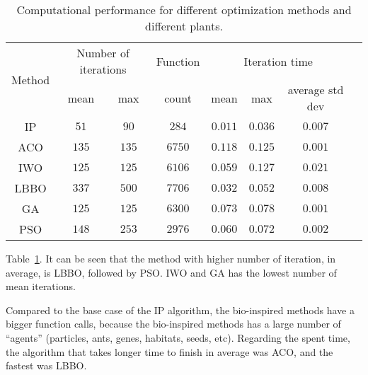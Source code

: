 \begin{table}[tb]%
	\centering
	\caption{Computational performance for different optimization methods and different plants.}\vspace{1mm}
	\begin{tabular}{cccccccc}
		\toprule
		\multirow{2}{*}{Method} & \multicolumn{2}{c}{Number of iterations}& Function & \multicolumn{3}{c}{Iteration time}\\
		\cline{2-3} \cline{5-7}
		& mean & max & count & mean & max & average std dev\\
		\midrule
		IP & $51$ & $90$ & $284$ & $0.011$ & $0.036$ & $0.007$ \\
		ACO & $135$ & $135$ & $6750$ & $0.118$ & $0.125$ & $0.001$\\
		IWO & $125$ & $125$ & $6106$ & $0.059$ & $0.127$ & $0.021$\\
		LBBO & $337$ & $500$ & $7706$ & $0.032$ & $0.052$ & $0.008$\\
		GA & $125$ & $125$ & $6300$ & $0.073$ & $0.078$ & $0.001$\\
		PSO & $148$ & $253$ & $2976$ & $0.060$ & $0.072$ & $0.002$\\
		\bottomrule 
	\end{tabular}
	\label{tab:Results01}
\end{table}
%
Table~\ref{tab:Results01}. It can be seen that the method with higher number of iteration, in average, is LBBO, followed by PSO. IWO and GA has the lowest number of mean iterations.

Compared to the base case of the IP algorithm, the bio-inspired methods have a bigger function calls, because the bio-inspired methods has a large number of ``agents'' (particles, ants, genes, habitats, seeds, etc).
Regarding the spent time, the algorithm that takes longer time to finish in average was ACO, and the fastest was LBBO.

